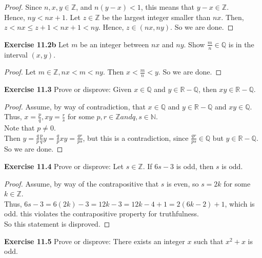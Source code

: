 \documentclass[12pt,oneside]{article}
\newenvironment{exercise}[1]{\vspace{.1in}\noindent\textbf{Exercise #1 \hspace{.05em}}}{}
\newcommand{\R}{\mathbb{R}}
\newcommand{\Z}{\mathbb{Z}}
\newcommand{\Q}{\mathbb{Q}}
\newcommand{\N}{\mathbb{N}}
\begin{document}
\begin{proof}
Since $n,x,y \in \Z$, and $n(y-x) < 1$, this means that $y-x \in \Z$.\\
Hence, $ny<nx+1$. Let $z \in \Z$ be the largest integer smaller than $nx$. Then, $z<nx\leq z+1<nx+1<ny$. Hence, $z \in (nx,ny)$. So we are done.
\end{proof}

\begin{exercise}{11.2b}
Let $m$ be an integer between $nx$ and $ny$. Show $\frac{m}{n} \in \Q$ is in the interval $(x,y)$.
\end{exercise}

\begin{proof}
Let $m\in \Z, nx < m < ny$. Then $x < \frac{m}{n} < y$. So we are done.
\end{proof}

\begin{exercise}{11.3}
Prove or disprove: Given $x \in \Q$ and $y \in \R-\Q$, then $xy \in \R-\Q$.
\end{exercise}

\begin{proof}
Assume, by way of contradiction, that $x \in \Q$ and $y \in \R-\Q$ and $xy \in \Q$.\\
Thus, $x = \frac{p}{q}, xy = \frac{r}{s}$ for some $p,r \in \Z and q,s \in \N$.\\
Note that $p \neq 0$.\\
Then $y=\frac{q}{p}\frac{p}{q}y = \frac{q}{p}xy = \frac{qr}{ps}$, but this is a contradiction, since $\frac{qr}{ps} \in \Q$ but $y \in \R-\Q$. So we are done.
\end{proof}

\begin{exercise}{11.4}
Prove or disprove: Let $s \in \Z$. If $6s-3$ is odd, then $s$ is odd.
\end{exercise}

\begin{proof}
Assume, by way of the contrapositive that $s$ is even, so $s=2k$ for some $k \in \Z$.\\
Thus, $6s-3=6(2k)-3=12k-3=12k-4+1=2(6k-2)+1$, which is odd. this violates the contrapositive property for truthfulness.\\
So this statement is disproved.
\end{proof}

\begin{exercise}{11.5}
Prove or disprove: There exists an integer $x$ such that $x^2+x$ is odd.
\end{exercise}
\end{document}
